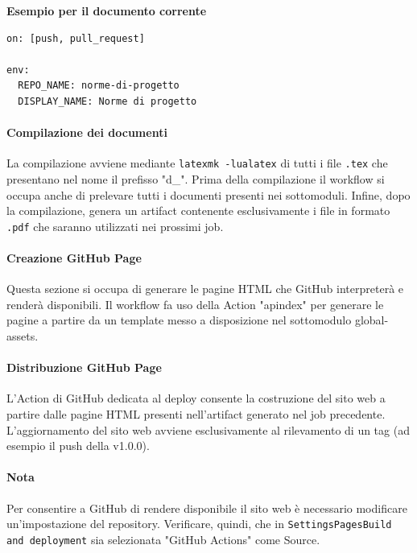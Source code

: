 

\textbf{Esempio per il documento corrente}\\

\begin{lstlisting}
on: [push, pull_request]

env:
  REPO_NAME: norme-di-progetto
  DISPLAY_NAME: Norme di progetto
\end{lstlisting}

\paragraph{Compilazione dei documenti} La compilazione avviene mediante \texttt{latexmk -lualatex} di tutti i file \texttt{.tex} che presentano nel nome il prefisso "d\_". Prima della compilazione il workflow si occupa anche di prelevare tutti i documenti presenti nei sottomoduli. Infine, dopo la compilazione, genera un artifact contenente esclusivamente i file in formato \texttt{.pdf} che saranno utilizzati nei prossimi job.



\paragraph{Creazione GitHub Page} Questa sezione si occupa di generare le pagine HTML che GitHub interpreterà e renderà disponibili. Il workflow fa uso della Action "apindex" per generare le pagine a partire da un template messo a disposizione nel sottomodulo global-assets.



\paragraph{Distribuzione GitHub Page} L'Action di GitHub dedicata al deploy consente la costruzione del sito web a partire dalle pagine HTML presenti nell'artifact generato nel job precedente. L'aggiornamento del sito web avviene esclusivamente al rilevamento di un tag (ad esempio il push della v1.0.0).




\paragraph{Nota} Per consentire a GitHub di rendere disponibile il sito web è necessario modificare un'impostazione del repository. Verificare, quindi, che in \texttt{Settings\rightarrow Pages\rightarrow Build and deployment} sia selezionata "GitHub Actions" come Source.

